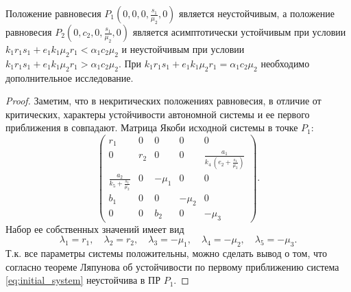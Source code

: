 \documentclass[14pt,a4paper]{extarticle}
\begin{document}
	\begin{theorem}\label{th:border_stab}
		Положение равновесия $P_1\left(0,0,0,\frac{s_1}{\mu_2},0\right)$ является неустойчивым, а положение равновесия $P_2\left(0,c_2,0,\frac{s_1}{\mu_2},0\right)$ является асимптотически устойчивым при условии $k_1r_1s_1 + e_1k_1\mu_2r_1< \alpha_1c_2\mu_2$ и неустойчивым при условии $k_1r_1s_1 + e_1k_1\mu_2r_1>\alpha_1c_2\mu_2$. При $k_1r_1s_1 + e_1k_1\mu_2r_1 = \alpha_1c_2\mu_2$ необходимо дополнительное исследование.
	\end{theorem}
	\begin{proof}
		Заметим, что в некритических положениях равновесия, в отличие от критических, характеры устойчивости автономной системы и ее первого приближения в совпадают.
		Матрица Якоби исходной системы в точке $P_1$:
		\[\begin{pmatrix}
			r_{1} & 0 & 0 & 0 & 0\\ 
			0 & r_{2} & 0 & 0 & \frac{a_{1}}{k_{4}\,\left(e_{2}+\frac{s_{1}}{\mu _{2}}\right)}\\ 
			\frac{a_{2}}{k_{5}+\frac{s_{1}}{\mu _{2}}} & 0 & -\mu _{1} & 0 & 0\\ 
			b_{1} & 0 & 0 & -\mu _{2} & 0\\ 
			0 & 0 & b_{2} & 0 & -\mu _{3} 
		\end{pmatrix}.\]
		Набор ее собственных значений имеет вид
		\[\lambda_1=r_1,\quad \lambda_2=r_2,\quad \lambda_3=-\mu_1,\quad \lambda_4=-\mu_2,\quad \lambda_5=-\mu_3.\]
		Т.к. все параметры системы положительны, можно сделать вывод о том, что согласно теореме Ляпунова об устойчивости по первому приближению система \ref{eq:initial_system} неустойчива в ПР $P_1$.
		

\end{proof}
\end{document}
